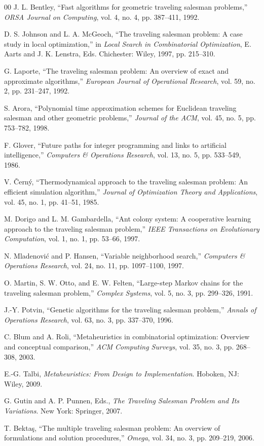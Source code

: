 \documentclass[conference]{IEEEtran}
\begin{document}
\begin{thebibliography}{00}
 J. L. Bentley,
``Fast algorithms for geometric traveling salesman problems,''
\textit{ORSA Journal on Computing}, vol. 4, no. 4, pp. 387--411, 1992.

 D. S. Johnson and L. A. McGeoch,
``The traveling salesman problem: A case study in local optimization,''
in \textit{Local Search in Combinatorial Optimization}, E. Aarts and J. K. Lenstra, Eds.
Chichester: Wiley, 1997, pp. 215--310.

 G. Laporte,
``The traveling salesman problem: An overview of exact and approximate algorithms,''
\textit{European Journal of Operational Research}, vol. 59, no. 2, pp. 231--247, 1992.

 S. Arora,
``Polynomial time approximation schemes for Euclidean traveling salesman and other geometric problems,''
\textit{Journal of the ACM}, vol. 45, no. 5, pp. 753--782, 1998.

 F. Glover,
``Future paths for integer programming and links to artificial intelligence,''
\textit{Computers \& Operations Research}, vol. 13, no. 5, pp. 533--549, 1986.

 V. \v{C}ern\'y,
``Thermodynamical approach to the traveling salesman problem: An efficient simulation algorithm,''
\textit{Journal of Optimization Theory and Applications}, vol. 45, no. 1, pp. 41--51, 1985.

 M. Dorigo and L. M. Gambardella,
``Ant colony system: A cooperative learning approach to the traveling salesman problem,''
\textit{IEEE Transactions on Evolutionary Computation}, vol. 1, no. 1, pp. 53--66, 1997.

 N. Mladenovi\'c and P. Hansen,
``Variable neighborhood search,''
\textit{Computers \& Operations Research}, vol. 24, no. 11, pp. 1097--1100, 1997.

 O. Martin, S. W. Otto, and E. W. Felten,
``Large-step Markov chains for the traveling salesman problem,''
\textit{Complex Systems}, vol. 5, no. 3, pp. 299--326, 1991.

 J.-Y. Potvin,
``Genetic algorithms for the traveling salesman problem,''
\textit{Annals of Operations Research}, vol. 63, no. 3, pp. 337--370, 1996.

 C. Blum and A. Roli,
``Metaheuristics in combinatorial optimization: Overview and conceptual comparison,''
\textit{ACM Computing Surveys}, vol. 35, no. 3, pp. 268--308, 2003.

 E.-G. Talbi,
\textit{Metaheuristics: From Design to Implementation}.
Hoboken, NJ: Wiley, 2009.

 G. Gutin and A. P. Punnen, Eds.,
\textit{The Traveling Salesman Problem and Its Variations}.
New York: Springer, 2007.

 T. Bekta\c{s},
``The multiple traveling salesman problem: An overview of formulations and solution procedures,''
\textit{Omega}, vol. 34, no. 3, pp. 209--219, 2006.

\end{thebibliography}
\end{document}
